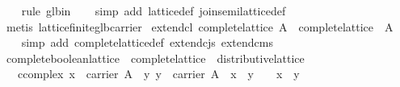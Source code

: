 \begin{isabellebody}
\ \ \isamarkupfalse%
\ {}rule\ glb{}in{}\isanewline
\ \ \isamarkupfalse%
\ {}simp\ add{}\ lattice{}def\ join{}semilattice{}def{}\isanewline
\ \ \isamarkupfalse%
\ {}metis\ lattice{}finite{}glb{}carrier{}%
\endisatagproof
{\isafoldproof}%
%
\isadelimproof
\isanewline
%
\endisadelimproof
\isanewline
{}\isamarkupfalse%
\ extend{}cl{}\ {}complete{}lattice\ A\ {}\ complete{}lattice\ {}{}\ A{}{}\isanewline
%
\isadelimproof
\ \ %
\endisadelimproof
%
\isatagproof
{}\isamarkupfalse%
\ {}simp\ add{}\ complete{}lattice{}def\ extend{}cjs\ extend{}cms{}%
\endisatagproof
{\isafoldproof}%
%
\isadelimproof
\isanewline
%
\endisadelimproof
\isanewline
{}\isamarkupfalse%
\ complete{}boolean{}lattice\ {}\ complete{}lattice\ {}\ distributive{}lattice\ {}\isanewline
\ \ \ ccompl{}ex{}\ {}x\ {}\ carrier\ A\ {}\ {}y{}\ y\ {}\ carrier\ A\ {}\ x\ {}\ y\ {}\ {}\ {}\ x\ {}\ y\ {}\ {}{}\isanewline

\end{isabellebody}
